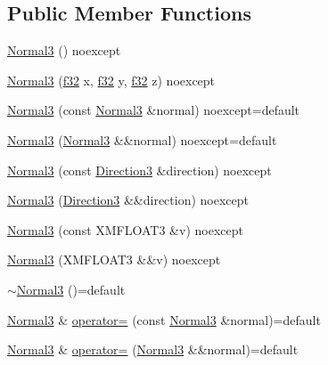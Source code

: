\subsection*{Public Member Functions}
\begin{DoxyCompactItemize}
\item 
\hyperlink{structmage_1_1_normal3_a64a99fa013aff357da71a39f1957e7c6}{Normal3} () noexcept
\item 
\hyperlink{structmage_1_1_normal3_af4d0bf7f7f4fd523952e4221d96606f5}{Normal3} (\hyperlink{namespacemage_a6a44ad388483959dc4dff9f2aef91431}{f32} x, \hyperlink{namespacemage_a6a44ad388483959dc4dff9f2aef91431}{f32} y, \hyperlink{namespacemage_a6a44ad388483959dc4dff9f2aef91431}{f32} z) noexcept
\item 
\hyperlink{structmage_1_1_normal3_af39f2985925addc37f1a9e3d00785b57}{Normal3} (const \hyperlink{structmage_1_1_normal3}{Normal3} \&normal) noexcept=default
\item 
\hyperlink{structmage_1_1_normal3_ab29b3dcf7fc05c459f2e9b91b6832115}{Normal3} (\hyperlink{structmage_1_1_normal3}{Normal3} \&\&normal) noexcept=default
\item 
\hyperlink{structmage_1_1_normal3_a477777d95f0ad41e6087668c965dd9b2}{Normal3} (const \hyperlink{structmage_1_1_direction3}{Direction3} \&direction) noexcept
\item 
\hyperlink{structmage_1_1_normal3_a55d265ba8454dd5d4573ad9d09844cee}{Normal3} (\hyperlink{structmage_1_1_direction3}{Direction3} \&\&direction) noexcept
\item 
\hyperlink{structmage_1_1_normal3_ad812f4b279f8ef1a28f71925c90efcf8}{Normal3} (const X\+M\+F\+L\+O\+A\+T3 \&v) noexcept
\item 
\hyperlink{structmage_1_1_normal3_ac6a5bc0d574ab2a85dba8e5cb8539d58}{Normal3} (X\+M\+F\+L\+O\+A\+T3 \&\&v) noexcept
\item 
\hyperlink{structmage_1_1_normal3_a3384b2970fd85fe729514ce0686b4446}{$\sim$\+Normal3} ()=default
\item 
\hyperlink{structmage_1_1_normal3}{Normal3} \& \hyperlink{structmage_1_1_normal3_ad446f029ba58615f98b4da13e7e4c5ba}{operator=} (const \hyperlink{structmage_1_1_normal3}{Normal3} \&normal)=default
\item 
\hyperlink{structmage_1_1_normal3}{Normal3} \& \hyperlink{structmage_1_1_normal3_ab8fd629ae1e399b468a229fc4ea58222}{operator=} (\hyperlink{structmage_1_1_normal3}{Normal3} \&\&normal)=default
\end{DoxyCompactItemize}


